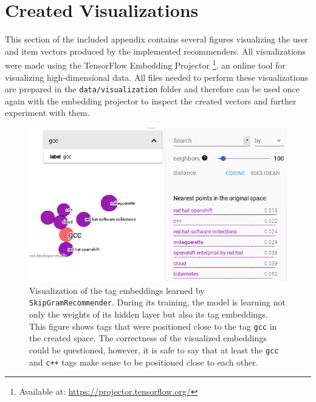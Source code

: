 \chapter{Created Visualizations}
This section of the included appendix contains several figures visualizing the user and item vectors produced by the implemented recommenders. All visualizations were made using the TensorFlow Embedding Projector \footnote{Available at: \url{https://projector.tensorflow.org/}}, an online tool for visualizing high-dimensional data. All files needed to perform these visualizations are prepared in the \texttt{data/visualization} folder and therefore can be used once again with the embedding projector to inspect the created vectors and further experiment with them.

\begin{figure}[H]
    \centering
    \includegraphics[scale=0.6]{obrazky-figures/tags_2.png}
    \caption{Visualization of the tag embeddings learned by \texttt{SkipGramRecommender}. During its training, the model is learning not only the weights of its hidden layer but also its tag embeddings. This figure shows tags that were positioned close to the tag \texttt{gcc} in the created space. The correctness of the visualized embeddings could be questioned, however, it is safe to say that at least the \texttt{gcc} and \texttt{c++} tags make sense to be positioned close to each other.}
\end{figure}


